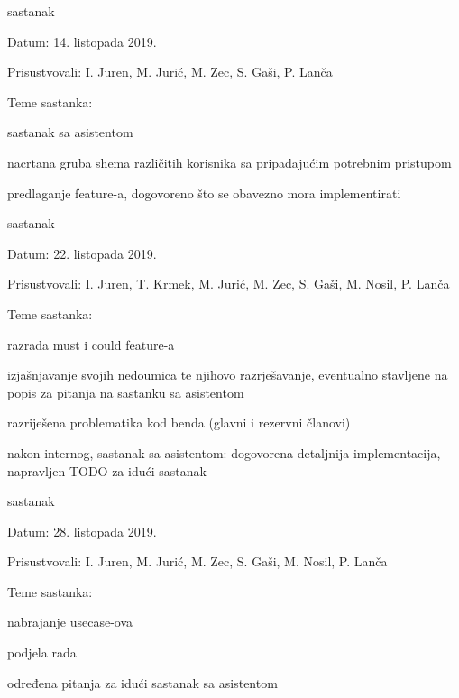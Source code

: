 \begin{packed_enum}
			\item  sastanak
			\item[] \begin{packed_item}
				\item Datum: 14. listopada 2019.
				\item Prisustvovali: I. Juren, M. Jurić, M. Zec, S. Gaši, P. Lanča
				\item Teme sastanka:
				\begin{packed_item}
					\item  sastanak sa asistentom
					\item  nacrtana gruba shema različitih korisnika sa pripadajućim potrebnim pristupom
					\item  predlaganje feature-a, dogovoreno što se obavezno mora implementirati 
				\end{packed_item}
			\end{packed_item}
			
			\item  sastanak
			\item[] \begin{packed_item}
				\item Datum: 22. listopada 2019.
				\item Prisustvovali: I. Juren, T. Krmek, M. Jurić, M. Zec, S. Gaši, M. Nosil, P. Lanča
				\item Teme sastanka:
				\begin{packed_item}
					\item  razrada must i could feature-a
					\item  izjašnjavanje svojih nedoumica te njihovo razrješavanje, eventualno stavljene na popis za pitanja na sastanku sa asistentom
					\item  razriješena problematika kod benda (glavni i rezervni članovi)
					\item  nakon internog, sastanak sa asistentom: dogovorena detaljnija implementacija, napravljen TODO za idući sastanak
				\end{packed_item}
			\end{packed_item}
			
			\item  sastanak
			\item[] \begin{packed_item}
				\item Datum: 28. listopada 2019.
				\item Prisustvovali: I. Juren, M. Jurić, M. Zec, S. Gaši, M. Nosil, P. Lanča
				\item Teme sastanka:
				\begin{packed_item}
					\item  nabrajanje usecase-ova
					\item  podjela rada
					\item  određena pitanja za idući sastanak sa asistentom
				\end{packed_item}
			\end{packed_item}
			

\end{packed_enum}
